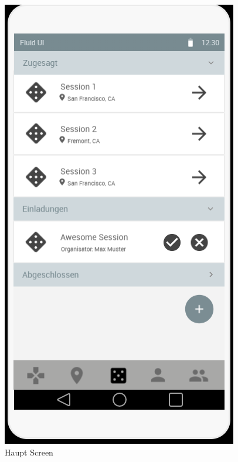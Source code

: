 \begin{figure}[H]
  \begin{minipage}[b]{0.4\textwidth}
    \includegraphics[width=\textwidth]{images/MainScreen.PNG}
    \caption{Haupt Screen}
    \label{fig:mainScreen}
  \end{minipage}
  \hfill
  \begin{minipage}[b]{0.4\textwidth}

\end{minipage}
\end{figure}
